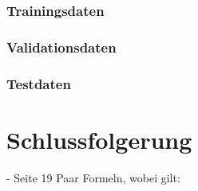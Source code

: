 \documentclass[11pt]{article}
\begin{document}
\subsubsection{Trainingsdaten}
\subsubsection{Validationsdaten}
\subsubsection{Testdaten}


\section{Schlussfolgerung}
- Seite 19
Paar Formeln, wobei gilt: \\

\newpage
\nolinenumbers{}
\end{document}
